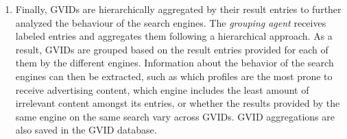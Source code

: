 \begin{enumerate}[label=\Roman*.]
    \item Finally, GVIDs are hierarchically aggregated by their result entries to further analyzed the behaviour of the search engines. The \textit{grouping agent} receives labeled entries and aggregates them following a hierarchical approach. As a result, GVIDs are grouped based on the result entries provided for each of them by the different engines. Information about the behavior of the search engines can then be extracted, such as which profiles are the most prone to receive advertising content, which engine includes the least amount of irrelevant content amongst its entries, or whether the results provided by the same engine on the same search vary across GVIDs. GVID aggregations are also saved in the GVID database.
\end{enumerate}

